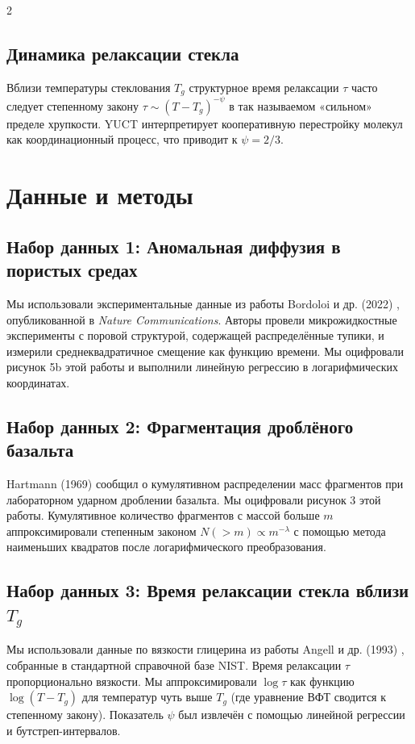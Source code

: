 \documentclass[11pt,a4paper]{article}
\begin{document}
\begin{multicols}{2}
		\subsection{Динамика релаксации стекла}
		Вблизи температуры стеклования \(T_g\) структурное время релаксации \(\tau\) часто следует степенному закону \(\tau \sim (T - T_g)^{-\psi}\) в так называемом «сильном» пределе хрупкости. YUCT интерпретирует кооперативную перестройку молекул как координационный процесс, что приводит к \(\psi = 2/3\).
		
		\section{Данные и методы}
		
		\subsection{Набор данных 1: Аномальная диффузия в пористых средах}
		Мы использовали экспериментальные данные из работы Bordoloi и др. (2022) \cite{Bordoloi2022}, опубликованной в \emph{Nature Communications}. Авторы провели микрожидкостные эксперименты с поровой структурой, содержащей распределённые тупики, и измерили среднеквадратичное смещение как функцию времени. Мы оцифровали рисунок 5b этой работы и выполнили линейную регрессию в логарифмических координатах.
		
		\subsection{Набор данных 2: Фрагментация дроблёного базальта}
		Hartmann (1969) \cite{Hartmann1969} сообщил о кумулятивном распределении масс фрагментов при лабораторном ударном дроблении базальта. Мы оцифровали рисунок 3 этой работы. Кумулятивное количество фрагментов с массой больше \(m\) аппроксимировали степенным законом \(N(>m) \propto m^{-\lambda}\) с помощью метода наименьших квадратов после логарифмического преобразования.
		
		\subsection{Набор данных 3: Время релаксации стекла вблизи \(T_g\)}
		Мы использовали данные по вязкости глицерина из работы Angell и др. (1993) \cite{Angell1993}, собранные в стандартной справочной базе NIST. Время релаксации \(\tau\) пропорционально вязкости. Мы аппроксимировали \(\log \tau\) как функцию \(\log(T - T_g)\) для температур чуть выше \(T_g\) (где уравнение ВФТ сводится к степенному закону). Показатель \(\psi\) был извлечён с помощью линейной регрессии и бутстреп-интервалов.
		

\end{multicols}
\end{document}
